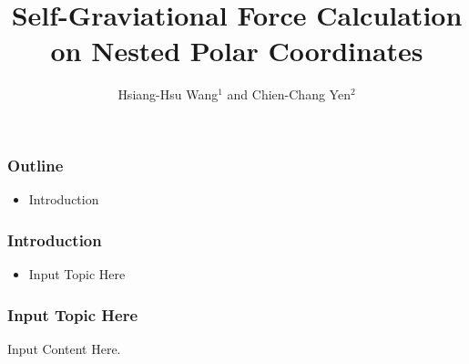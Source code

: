 \documentclass[14pt,aspectratio=169]{beamer}
\begin{document}
\title{Self-Graviational Force Calculation on Nested Polar Coordinates}
\author{Hsiang-Hsu Wang${}^1$ and Chien-Chang Yen${}^2$}
\begin{frame}
\titlepage
\end{frame}
\begin{frame}
\frametitle{Outline}
\begin{itemize}
\item Introduction
\end{itemize}
\end{frame}
\begin{frame}
\frametitle{Introduction}
\begin{itemize}\item Input Topic Here
\end{itemize}
\end{frame}

\begin{frame}
\frametitle{Input Topic Here}
Input Content Here.
\end{frame}
\end{document}
